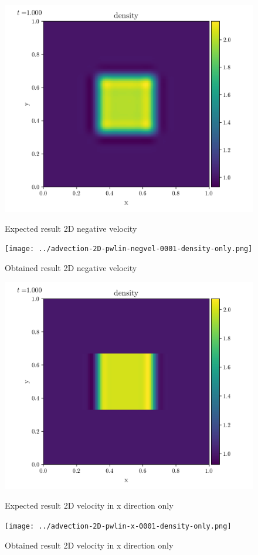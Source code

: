    \begin{figure}[htbp]
        \centering
        \includegraphics[width=.7\textwidth]{./figures/advection-2D-pwlin-negvel-0001-density-only.png}%
        \caption{Expected result 2D negative velocity}
        \texttt{[image: ../advection-2D-pwlin-negvel-0001-density-only.png]}%
        \caption{Obtained result 2D negative velocity}
    \end{figure}

    \begin{figure}[htbp]
        \centering
        \includegraphics[width=.7\textwidth]{./figures/advection-2D-pwlin-x-0001-density-only.png}%
        \caption{Expected result 2D velocity in x direction only}
        \texttt{[image: ../advection-2D-pwlin-x-0001-density-only.png]}%
        \caption{Obtained result 2D velocity in x direction only}
    \end{figure}


